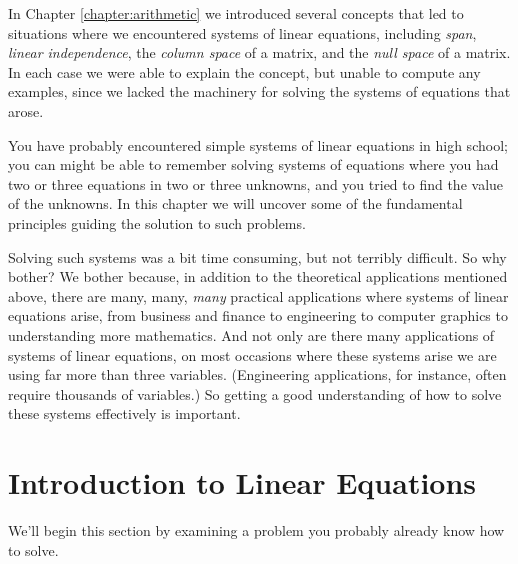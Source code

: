 In Chapter \ref{chapter:arithmetic} we introduced several concepts that led to situations where we encountered systems of linear equations, including \textit{span}, \textit{linear independence}, the \textit{column space} of a matrix, and the \textit{null space} of a matrix. In each case we were able to explain the concept, but unable to compute any examples, since we lacked the machinery for solving the systems of equations that arose.


You have probably encountered simple systems of linear equations in high school; you can might be able to remember solving systems of equations where you had two or three equations in two or three unknowns, and you tried to find the value of the unknowns. In this chapter we will uncover some of the fundamental principles guiding the solution to such problems.

Solving such systems was a bit time consuming, but not terribly difficult. So why bother? We bother because, in addition to the theoretical applications mentioned above, there are many, many, \textit{many} practical applications where systems of linear equations arise, from business and finance to engineering to computer graphics to understanding more mathematics. And not only are there many applications of systems of linear equations, on most occasions where these systems arise we are using far more than three variables. (Engineering applications, for instance, often require thousands of variables.) So getting a good understanding of how to solve these systems effectively is important.\\

\section{Introduction to Linear Equations}\label{sec:intro}


We'll begin this section by examining a problem you probably already know how to solve.

